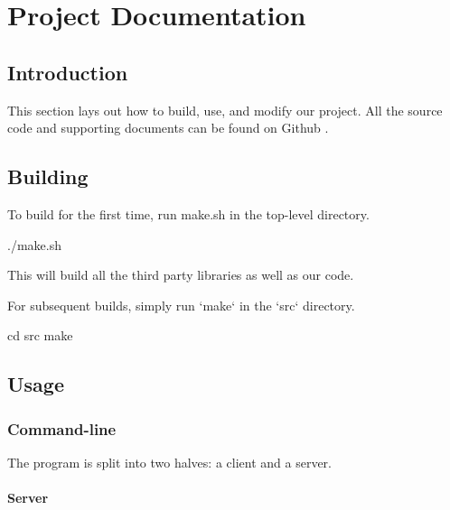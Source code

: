 \chapter{Project Documentation}



\section{Introduction}

This section lays out how to build, use, and modify our project.
All the source code and supporting documents can be found on Github \cite{Github}.

\section{Building}

To build for the first time, run make.sh in the top-level directory.

    ./make.sh

This will build all the third party libraries as well as our code.

For subsequent builds, simply run `make` in the `src` directory.

    cd src
    make

\section{Usage}

\subsection{Command-line}

The program is split into two halves: a client and a server.

\subsubsection{Server}

